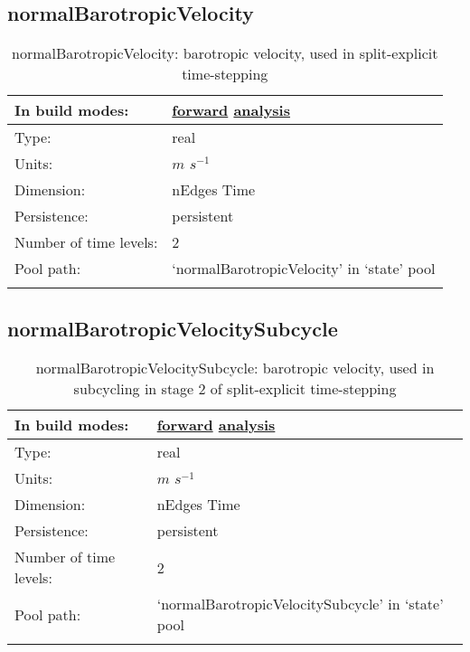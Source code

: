 \subsection[normalBarotropicVelocity]{normalBarotropicVelocity}
\label{subsec:var_sec_state_normalBarotropicVelocity}
\begin{center}
\begin{longtable}{| p{2.0in} | p{4.0in} |}
        \hline 
        In build modes: & \hyperref[subsec:forward_var_tab_state]{forward} \hyperref[subsec:analysis_var_tab_state]{analysis} \\
        \hline 
        Type: & real \\
        \hline 
        Units: & $m$ $s^{-1}$ \\
        \hline 
        Dimension: & nEdges Time \\
        \hline 
        Persistence: & persistent \\
        \hline 
        Number of time levels: & 2 \\
        \hline 
            Pool path: & `normalBarotropicVelocity' in `state' pool \\
		 \hline 
    \caption{normalBarotropicVelocity: barotropic velocity, used in split-explicit time-stepping}
\end{longtable}
\end{center}
\subsection[normalBarotropicVelocitySubcycle]{normalBarotropicVelocitySubcycle}
\label{subsec:var_sec_state_normalBarotropicVelocitySubcycle}
\begin{center}
\begin{longtable}{| p{2.0in} | p{4.0in} |}
        \hline 
        In build modes: & \hyperref[subsec:forward_var_tab_state]{forward} \hyperref[subsec:analysis_var_tab_state]{analysis} \\
        \hline 
        Type: & real \\
        \hline 
        Units: & $m$ $s^{-1}$ \\
        \hline 
        Dimension: & nEdges Time \\
        \hline 
        Persistence: & persistent \\
        \hline 
        Number of time levels: & 2 \\
        \hline 
            Pool path: & `normalBarotropicVelocitySubcycle' in `state' pool \\
		 \hline 
    \caption{normalBarotropicVelocitySubcycle: barotropic velocity, used in subcycling in stage 2 of split-explicit time-stepping}
\end{longtable}
\end{center}
